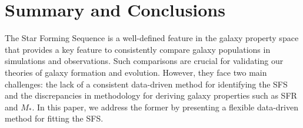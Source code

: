 \documentclass[preprint2,tighten]{aastex62}
\newcommand{\todo}[1]{{\bf \textcolor{red}{ #1}}}
\begin{document}


\section{Summary and Conclusions} \label{sec:summary}
The Star Forming Sequence is a well-defined feature in the galaxy 
property space that provides a key feature to consistently compare
galaxy populations in simulations and observations.
Such comparisons are crucial for validating our theories of
galaxy formation and evolution. However, they face two main challenges: 
the lack of a consistent data-driven method for identifying the SFS and 
the discrepancies in methodology for deriving galaxy properties such as 
SFR and $M_*$. In this paper, we address the former by presenting 
a flexible data-driven method for fitting the SFS. 
\end{document}
